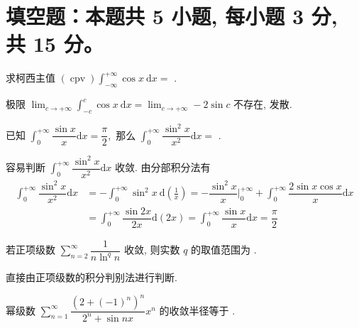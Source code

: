 \section{填空题：本题共 5 小题, 每小题 3 分, 共 15 分。}



\begin{question}
求柯西主值 $\displaystyle (\operatorname{cpv})\int_{-\infty}^{+\infty} \cos x ~ \mathrm{d}x =$ \fillin[发散].
\end{question}

\begin{solution}
极限 $\displaystyle \lim_{c\to+\infty} \int_{-c}^{c} \cos x ~ \mathrm{d}x = \lim_{c\to+\infty} -2\sin c$ 不存在, 发散.
\end{solution}

\begin{question}
已知 $\displaystyle \int_0^{+\infty} \dfrac{\sin x}{x} \mathrm{d}x = \dfrac{\pi}{2},$ 那么 $\displaystyle \int_0^{+\infty} \dfrac{\sin^2 x}{x^2} \mathrm{d}x =$ \fillin[$\dfrac{\pi}{2}$].
\end{question}

\begin{solution}
容易判断 $\displaystyle \int_0^{+\infty} \dfrac{\sin^2 x}{x^2} \mathrm{d}x$ 收敛. 由分部积分法有
\begin{align*}
\int_0^{+\infty} \dfrac{\sin^2 x}{x^2} \mathrm{d}x & = - \int_0^{+\infty} \sin^2 x ~\mathrm{d} \left(\frac{1}{x}\right) = - \dfrac{\sin^2 x}{x} \bigg|_0^{+\infty} + \int_0^{+\infty} \dfrac{2\sin x \cos x}{x} \mathrm{d}x \\
& = \int_0^{+\infty} \dfrac{\sin 2x}{2x} \mathrm{d}(2x) = \int_0^{+\infty} \dfrac{\sin x}{x} \mathrm{d}x = \dfrac{\pi}{2}
\end{align*}
\end{solution}

\begin{question}
若正项级数 $\displaystyle \sum_{n=2}^\infty \dfrac{1}{n \ln^q n}$ 收敛, 则实数 $q$ 的取值范围为 \fillin[$q > 1$].
\end{question}

\begin{solution}
直接由正项级数的积分判别法进行判断.
\end{solution}

\begin{question}
幂级数 $\displaystyle \sum\limits_{n=1}^{\infty} \dfrac{\left( 2 + (-1)^n \right)^n}{2^n + \sin nx} x^n$ 的收敛半径等于 \fillin[$\dfrac{2}{3}$].
\end{question}

